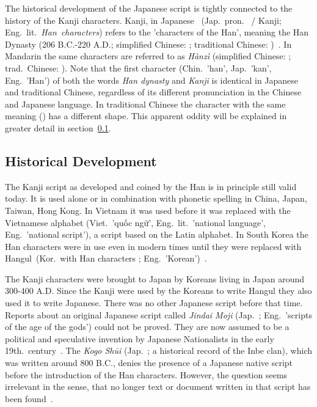 The historical development of the Japanese script is tightly connected to the 
history of the Kanji characters. Kanji, in Japanese 
~(Jap.~pron.~ / Kanji; Eng.~lit.~\emph{Han~characters}) 
refers to the 'characters of the Han', meaning the Han Dynasty 
(206 B.C.-220 A.D.; simplified Chinese: ; traditional Chinese: 
)~. In Mandarin the same characters are 
referred to as \emph{Hànzì} (simplified Chinese: ; 
trad.\ Chinese: ).
Note that the first character  (Chin.~'han', Jap.~'kan', Eng.~'Han') 
of both the words \emph{Han dynasty} and \emph{Kanji} is identical in Japanese 
and traditional Chinese, regardless of its different pronunciation in the 
Chinese and Japanese language. In traditional Chinese the character with
the same meaning () has a different shape. This apparent oddity will be 
explained in greater detail in 
section~\ref{sec:historicaldevelopmentofjapanesescript}.

\subsection{Historical Development}
\label{sec:historicaldevelopmentofjapanesescript}

The Kanji script as developed and coined by the Han is in principle still valid 
today. It is used alone or in combination with phonetic spelling in China, Japan,
Taiwan, Hong Kong. In Vietnam it was used before it was replaced with the 
Vietnamese alphabet (Viet.~'quốc ngữ', Eng.~lit.~'national language',
Eng.~'national script'), a script based on the Latin alphabet. In South Korea 
the Han characters were in use even in modern times until they were 
replaced with 
Hangul~(Kor.~with Han characters 
; Eng.~'Korean')~.

The Kanji characters were brought to Japan by Koreans living in Japan around 
300-400 A.D. Since the Kanji were used by the Koreans to write 
Hangul they also used it to write Japanese. There was no other Japanese script 
before that time. Reports about an original Japanese script called 
\emph{Jindai Moji} (Jap.~; Eng.~'scripts of the age of the gods')
could not be proved. They are now assumed to be a political and speculative 
invention by Japanese Nationalists in the early 
19th.~century~. The \emph{Kogo Shūi} 
(Jap.~; a historical record of the Inbe clan),
which was written around 800 B.C., denies the presence of a Japanese native
script before the introduction of the Han characters. However, the question
seems irrelevant in the sense, that no longer text or document written in 
that script has been found~.

